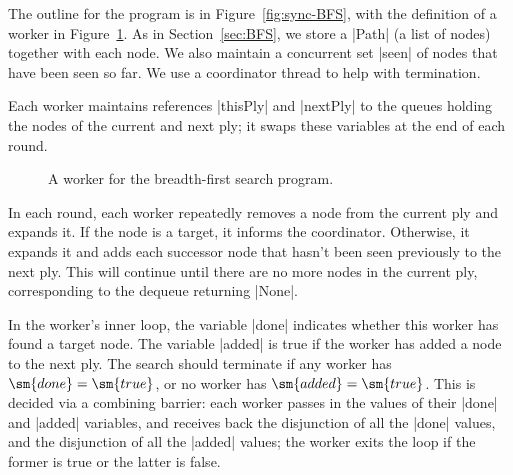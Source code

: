 
The outline for the program is in Figure~\ref{fig:sync-BFS}, with the
definition of a worker in Figure~\ref{fig:sync-BFS-worker}.  As in
Section~\ref{sec:BFS}, we store a |Path| (a list of nodes) together with each
node.  We also maintain a concurrent set |seen| of nodes that have been seen
so far.  We use a coordinator thread to help with termination. 

Each worker maintains references |thisPly| and |nextPly| to the queues holding
the nodes of the current and next ply; it swaps these variables at the end of
each round. 


\begin{figure}
\caption{A worker for the breadth-first search program.}
\label{fig:sync-BFS-worker}
\end{figure}

In each round, each worker repeatedly removes a node from the current ply and
expands it.  If the node is a target, it informs the coordinator.  Otherwise,
it expands it and adds each successor node that hasn't been seen previously to
the next ply.  This will continue until there are no more nodes in the current
ply, corresponding to the dequeue returning |None|.

In the worker's inner loop, the variable |done| indicates whether this worker
has found a target node.  The variable |added| is true if the worker has added
a node to the next ply.  The search should terminate if any worker has
$ = $, or no worker has $ = $.  This is
decided via a combining barrier: each worker passes in the values of their
|done| and |added| variables, and receives back the disjunction of all the
|done| values, and the disjunction of all the |added| values; the worker exits
the loop if the former is true or the latter is false.

